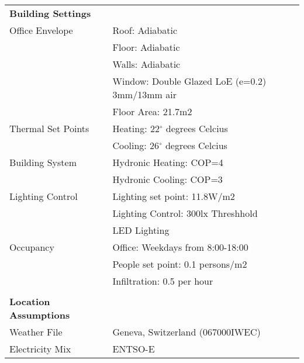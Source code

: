 \begin{table}[H]
\centering
\begin{tabular}{ll}
\hline
\textbf{Building Settings}    &                                                \\
Office Envelope               & Roof: Adiabatic                                \\
                              & Floor: Adiabatic                               \\
                              & Walls: Adiabatic                               \\
                              & Window: Double Glazed LoE (e=0.2) 3mm/13mm air \\
                              & Floor Area: 21.7m2                             \\
Thermal Set Points            & Heating: 22$^{\circ}$ degrees Celcius                    \\
                              & Cooling: 26$^{\circ}$ degrees Celcius                    \\
Building System               & Hydronic Heating: COP=4                        \\
                              & Hydronic Cooling: COP=3                         \\
Lighting Control              & Lighting set point: 11.8W/m2                   \\
                              & Lighting Control: 300lx Threshhold           \\
                              & LED Lighting                                   \\
Occupancy                     & Office: Weekdays from 8:00-18:00               \\
                              & People set point: 0.1 persons/m2               \\
                              & Infiltration: 0.5 per hour                     \\
                              &                                                \\
\textbf{Location Assumptions} &                                                \\
Weather File                  & Geneva, Switzerland (067000IWEC)              \\
Electricity Mix               & ENTSO-E\cite{itten2012life}                                           \\

\end{tabular}
\end{table}
